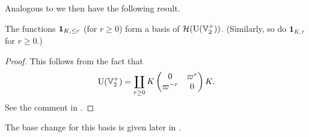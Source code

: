 Analogous to  we then have the following result.
\begin{proposition}
  The functions $\mathbf{1}_{K, \le r}$ (for $r \ge 0$) form a basis of $\mathcal H(\operatorname{U}(\mathbb V_2^+))$.
  (Similarly, so do $\mathbf{1}_{K, r}$ for $r \ge 0$.)
\end{proposition}
\begin{proof}
  This follows from the fact that
  \[ \operatorname{U}(\mathbb V_2^+) = \coprod_{r \ge 0}
    K \begin{pmatrix} 0 & \varpi^r \\ \varpi^{-r} & 0 \end{pmatrix} K. \]
  See the comment in \cite[Equation (7.1.5)]{ref:AFLspherical}.
\end{proof}

The base change for this basis is given later in .

